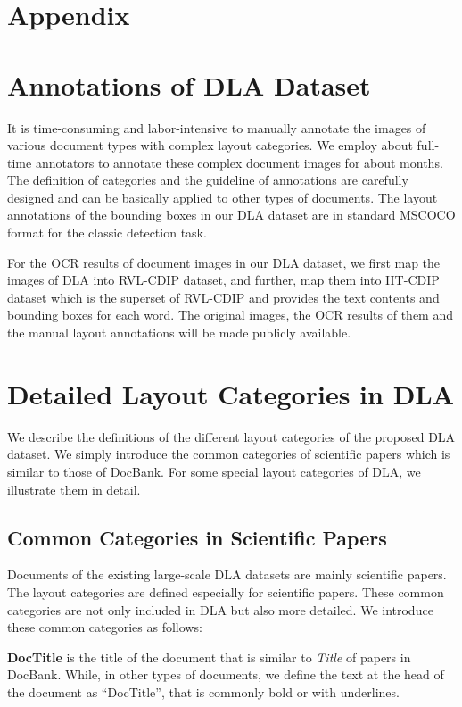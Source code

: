 \documentclass[10pt,twocolumn,letterpaper]{article}
\begin{document}
{\small


}

\clearpage
\appendix

\section*{Appendix}
\section{Annotations of DLA Dataset}
It is time-consuming and labor-intensive to manually annotate the images of various document types with complex layout categories.
We employ about  full-time annotators to annotate these complex document images for about  months.
The definition of categories and the guideline of annotations are carefully designed and can be basically applied to other types of documents.
The layout annotations of the bounding boxes in our DLA dataset are in standard MSCOCO format for the classic detection task.

For the OCR results of document images in our DLA dataset, we first map the images of DLA into RVL-CDIP dataset, 
and further, map them into IIT-CDIP dataset which is the superset of RVL-CDIP and provides the text contents and bounding boxes for each word.
The original images, the OCR results of them and the manual layout annotations will be made publicly available.


\section{Detailed Layout Categories in DLA}
We describe the definitions of the different layout categories of the proposed DLA dataset.
We simply introduce the common categories of scientific papers which is similar to those of DocBank.
For some special layout categories of DLA, we illustrate them in detail.


\subsection{Common Categories in Scientific Papers} 
Documents of the existing large-scale DLA datasets are mainly scientific papers.
The layout categories are defined especially for scientific papers.
These common categories are not only included in DLA
but also more detailed.
We introduce these common categories as follows:


\noindent
\textbf{DocTitle} is the title of the document that is similar to \textit{Title} of papers in DocBank. 
While, in other types of documents, we define the text at the head of the document as ``DocTitle'',
that is commonly bold or with underlines.
\end{document}
